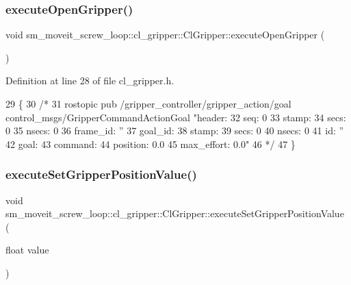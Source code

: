 \subsubsection{\texorpdfstring{execute\+Open\+Gripper()}{executeOpenGripper()}}
{\footnotesize\ttfamily void sm\+\_\+moveit\+\_\+screw\+\_\+loop\+::cl\+\_\+gripper\+::\+Cl\+Gripper\+::execute\+Open\+Gripper (\begin{DoxyParamCaption}{ }\end{DoxyParamCaption})\hspace{0.3cm}{\ttfamily [inline]}}



Definition at line 28 of file cl\+\_\+gripper.\+h.


\begin{DoxyCode}
29   \{
30     \textcolor{comment}{/*}
31 \textcolor{comment}{  rostopic pub /gripper\_controller/gripper\_action/goal control\_msgs/GripperCommandActionGoal "header:}
32 \textcolor{comment}{  seq: 0}
33 \textcolor{comment}{  stamp:}
34 \textcolor{comment}{    secs: 0}
35 \textcolor{comment}{    nsecs: 0}
36 \textcolor{comment}{  frame\_id: ''}
37 \textcolor{comment}{goal\_id:}
38 \textcolor{comment}{  stamp:}
39 \textcolor{comment}{    secs: 0}
40 \textcolor{comment}{    nsecs: 0}
41 \textcolor{comment}{  id: ''}
42 \textcolor{comment}{goal:}
43 \textcolor{comment}{  command:}
44 \textcolor{comment}{    position: 0.0}
45 \textcolor{comment}{    max\_effort: 0.0"}
46 \textcolor{comment}{    */}
47   \}
\end{DoxyCode}
\mbox{\label{classsm__moveit__screw__loop_1_1cl__gripper_1_1ClGripper_a097a0ac9c0404c11e2be045b328e31c7}} 
\subsubsection{\texorpdfstring{execute\+Set\+Gripper\+Position\+Value()}{executeSetGripperPositionValue()}}
{\footnotesize\ttfamily void sm\+\_\+moveit\+\_\+screw\+\_\+loop\+::cl\+\_\+gripper\+::\+Cl\+Gripper\+::execute\+Set\+Gripper\+Position\+Value (\begin{DoxyParamCaption}\item[{float}]{value }\end{DoxyParamCaption})\hspace{0.3cm}{\ttfamily [inline]}}



